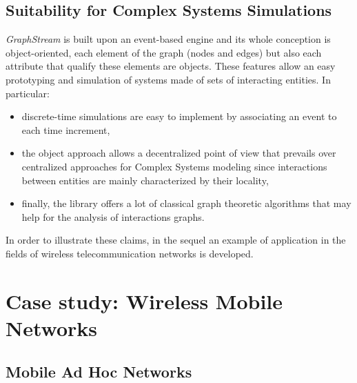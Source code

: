 \documentclass{svmult}
\begin{document}
\subsection{Suitability for Complex Systems Simulations}




\emph{GraphStream} is built upon an event-based engine and its whole
conception is object-oriented, each element of the graph (nodes and edges) but
also each attribute that qualify these elements are objects. 
These features allow an easy prototyping and simulation of systems made
of sets of interacting entities.
In particular:

\begin{itemize}
\item discrete-time simulations are easy to implement by associating
  an event to each time increment,
\item the object approach allows a decentralized point of view that prevails
  over centralized approaches for Complex Systems modeling since interactions
  between entities are mainly characterized by their locality,
\item finally, the library offers a lot of classical graph theoretic
  algorithms that may help for the analysis of interactions graphs. 
\end{itemize}

In order to illustrate these claims, in the sequel an example of application
in the fields of wireless telecommunication networks is developed.

\section{Case study: Wireless Mobile Networks}


\subsection{Mobile Ad Hoc Networks}
\end{document}
